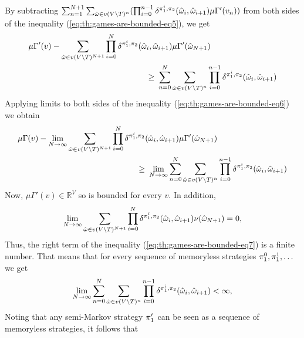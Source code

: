 \begin{myproof}
\begin{align}
  \end{align}
  By subtracting
  $\sum^{N+1}_{n=1} \sum_{\hat{\omega} \in v(V \setminus T)^{n}}(\prod^{n-1}_{i=0} \delta^{\pi_{1}^i, \pi_{2}}(\hat{\omega}_i, \hat{\omega}_{i+1}) \mu \Gamma' (v_{n}))$
  from both sides of the inequality
  (\ref{eq:th:games-are-bounded-eq5}), we get
  \begin{align}
    \label{eq:th:games-are-bounded-eq6}
    \mu \Gamma'(v)  - \sum_{\hat{\omega} \in v(V \setminus T)^{N+1}}\prod^{N}_{i=0} \delta^{\strat{1}^i, \strat{2}}(\hat{\omega}_i,\hat{\omega}_{i+1}) \mu \Gamma'(\hat{\omega}_{N+1})  \hspace{-6.5em}& \\
    \geq \ & \sum^{N}_{n=0} \sum_{\hat{\omega} \in v(V \setminus T)^n}\prod^{n-1}_{i=0} \delta^{\strat{1}^i, \strat{2}}(\hat{\omega}_i, \hat{\omega}_{i+1}) \notag
  \end{align}
  Applying limits to both sides of the inequality
  (\ref{eq:th:games-are-bounded-eq6}) we obtain
  \begin{align}
    \label{eq:th:games-are-bounded-eq7}
    \mu \Gamma(v)  - \lim_{N \to \infty} \sum_{\hat{\omega} \in v(V \setminus T)^{N+1}}\prod^{N}_{i=0} \delta^{\strat{1}^i, \strat{2}}(\hat{\omega}_i,\hat{\omega}_{i+1}) \mu \Gamma'(\hat{\omega}_{N+1})  \hspace{-8.5em}& \\
    \geq \ & \lim_{N \to \infty} \sum^{N}_{n=0} \sum_{\hat{\omega} \in v(V \setminus T)^n}\prod^{n-1}_{i=0} \delta^{\strat{1}^i, \strat{2}}(\hat{\omega}_i, \hat{\omega}_{i+1}) \notag
  \end{align}
  Now,  $\mu \Gamma'(v) \in \mathbb{R}^V$ so is
  bounded for every $v$.  In addition,
  \[
  \lim_{N \to \infty}\sum_{\hat{\omega} \in v(V \setminus T)^{N+1}}\prod^{N}_{i=0} \delta^{\pi_{1}^i, \pi_{2}}(\hat{\omega}_i,\hat{\omega}_{i+1}) \nu(\hat{\omega}_{N+1}) = 0,
  \]
  Thus, the right term of the inequality
  (\ref{eq:th:games-are-bounded-eq7}) is a finite number.  That means
  that for every sequence of memoryless strategies
  $\pi_{1}^0,\pi_{1}^1, \dots$ we get
  \[
  \lim_{N \to \infty} \sum^{N}_{n=0} \sum_{\hat{\omega} \in v(V \setminus T)^n}\prod^{n-1}_{i=0} \delta^{\pi_{1}^i, \pi_{2}}(\hat{\omega}_i, \hat{\omega}_{i+1}) < \infty,
  \]
  Noting that any semi-Markov strategy $\pi_{1}'$ can be seen as a
  sequence of memoryless strategies, it follows that

\end{myproof}
